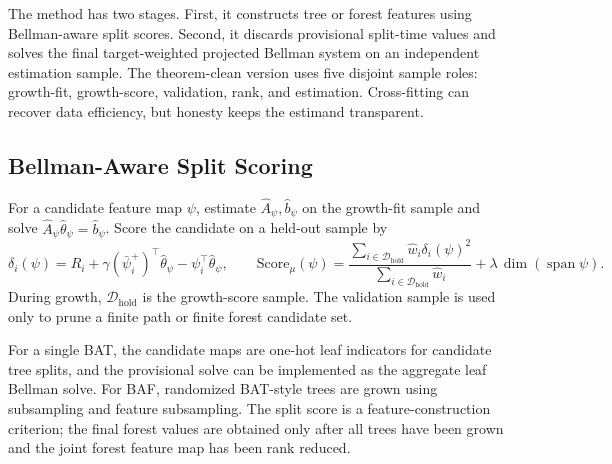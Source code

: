 \documentclass{article}
\DeclareMathOperator{\spann}{span}
\newcommand{\cD}{\mathcal D}
\newcommand{\hatA}{\widehat A}
\newcommand{\hatb}{\widehat b}
\theoremstyle{plain}
\theoremstyle{definition}
\theoremstyle{remark}
\begin{document}
The method has two stages. First, it constructs tree or forest features using
Bellman-aware split scores. Second, it discards provisional split-time values
and solves the final target-weighted projected Bellman system on an independent
estimation sample. The theorem-clean version uses five disjoint sample roles:
growth-fit, growth-score, validation, rank, and estimation. Cross-fitting can
recover data efficiency, but honesty keeps the estimand transparent.

\subsection{Bellman-Aware Split Scoring}

For a candidate feature map \(\psi\), estimate \(\hatA_\psi,\hatb_\psi\) on
the growth-fit sample and solve
\(\hatA_\psi\hat\theta_\psi=\hatb_\psi\). Score the candidate on a held-out
sample by
\[
  \delta_i(\psi)
  =
  R_i+\gamma(\bar\psi_i^+)^\top\hat\theta_\psi
  -\psi_i^\top\hat\theta_\psi,
  \qquad
  \mathrm{Score}_\mu(\psi)
  =
  \frac{\sum_{i\in\cD_{\mathrm{hold}}}\hat w_i\delta_i(\psi)^2}
       {\sum_{i\in\cD_{\mathrm{hold}}}\hat w_i}
  +\lambda\,\dim(\spann\psi).
  \label{eq:score}
\]
During growth, \(\cD_{\mathrm{hold}}\) is the growth-score sample. The
validation sample is used only to prune a finite path or finite forest
candidate set.

For a single BAT, the candidate maps are one-hot leaf indicators for candidate
tree splits, and the provisional solve can be implemented as the aggregate
leaf Bellman solve. For BAF, randomized BAT-style trees are grown using
subsampling and feature subsampling. The split score is a feature-construction
criterion; the final forest values are obtained only after all trees have been
grown and the joint forest feature map has been rank reduced.
\end{document}
